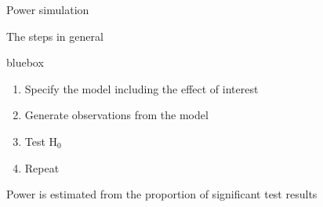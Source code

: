 \documentclass[aspectratio=169]{beamer}
\newenvironment{colbox}[1][\textwidth]%
  {\begin{beamercolorbox}[wd=#1, rounded=true, shadow=true]{bluebox}}
  {\end{beamercolorbox}}
\begin{document}
\begin{frame}{Power simulation}

The steps in general\\[1ex]

\begin{colbox}
\begin{enumerate}
\item Specify the model including the effect of interest

\item Generate observations from the model

\item Test H$_0$

\item Repeat
\end{enumerate}
\end{colbox}

\vspace{2ex}

Power is estimated from the proportion of significant test results

\end{frame}

%
\end{document}
